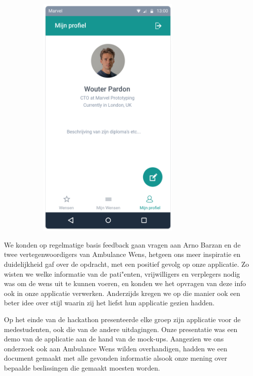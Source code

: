 \begin{figure}[!h]
\begin{subfigure}[h]{0.3\textwidth}
    \includegraphics[width=0.76\textwidth]{images/care-athon/profiel.png}
  \end{subfigure}
\end{figure}

We konden op regelmatige basis feedback gaan vragen aan Arno Barzan en de twee vertegenwoordigers van Ambulance Wens, hetgeen ons meer inspiratie en duidelijkheid gaf over de opdracht, met een positief gevolg op onze applicatie. Zo wisten we welke informatie van de pati"enten, vrijwilligers en verplegers nodig was om de wens uit te kunnen voeren, en konden we het opvragen van deze info ook in onze applicatie verwerken. Anderzijds kregen we op die manier ook een beter idee over stijl waarin zij het liefst hun applicatie gezien hadden.

Op het einde van de hackathon presenteerde elke groep zijn applicatie voor de medestudenten, ook die van de andere uitdagingen. Onze presentatie was een demo van de applicatie aan de hand van de mock\hyp{}ups. Aangezien we ons onderzoek ook aan Ambulance Wens wilden overhandigen, hadden we een document gemaakt met alle gevonden informatie alsook onze mening over bepaalde beslissingen die gemaakt moesten worden.

